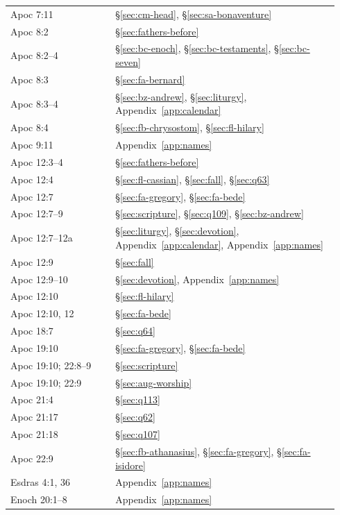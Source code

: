 \begin{longtable}{>{\raggedright\arraybackslash}p{0.30\linewidth}>{\raggedright\arraybackslash}p{0.64\linewidth}}
Apoc 7:11 & \S\ref{sec:cm-head}, \S\ref{sec:sa-bonaventure}\\
Apoc 8:2 & \S\ref{sec:fathers-before}\\
Apoc 8:2--4 & \S\ref{sec:bc-enoch}, \S\ref{sec:bc-testaments}, \S\ref{sec:bc-seven}\\
Apoc 8:3 & \S\ref{sec:fa-bernard}\\
Apoc 8:3--4 & \S\ref{sec:bz-andrew}, \S\ref{sec:liturgy}, Appendix~\ref{app:calendar}\\
Apoc 8:4 & \S\ref{sec:fb-chrysostom}, \S\ref{sec:fl-hilary}\\
Apoc 9:11 & Appendix~\ref{app:names}\\
Apoc 12:3--4 & \S\ref{sec:fathers-before}\\
Apoc 12:4 & \S\ref{sec:fl-cassian}, \S\ref{sec:fall}, \S\ref{sec:q63}\\
Apoc 12:7 & \S\ref{sec:fa-gregory}, \S\ref{sec:fa-bede}\\
Apoc 12:7--9 & \S\ref{sec:scripture}, \S\ref{sec:q109}, \S\ref{sec:bz-andrew}\\
Apoc 12:7--12a & \S\ref{sec:liturgy}, \S\ref{sec:devotion}, Appendix~\ref{app:calendar}, Appendix~\ref{app:names}\\
Apoc 12:9 & \S\ref{sec:fall}\\
Apoc 12:9--10 & \S\ref{sec:devotion}, Appendix~\ref{app:names}\\
Apoc 12:10 & \S\ref{sec:fl-hilary}\\
Apoc 12:10, 12 & \S\ref{sec:fa-bede}\\
Apoc 18:7 & \S\ref{sec:q64}\\
Apoc 19:10 & \S\ref{sec:fa-gregory}, \S\ref{sec:fa-bede}\\
Apoc 19:10; 22:8--9 & \S\ref{sec:scripture}\\
Apoc 19:10; 22:9 & \S\ref{sec:aug-worship}\\
Apoc 21:4 & \S\ref{sec:q113}\\
Apoc 21:17 & \S\ref{sec:q62}\\
Apoc 21:18 & \S\ref{sec:q107}\\
Apoc 22:9 & \S\ref{sec:fb-athanasius}, \S\ref{sec:fa-gregory}, \S\ref{sec:fa-isidore}\\
4 Esdras 4:1, 36 & Appendix~\ref{app:names}\\
1 Enoch 20:1--8 & Appendix~\ref{app:names}\\
\end{longtable}
\endgroup
